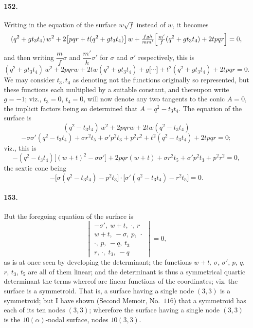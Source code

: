 \documentclass[11pt,a4paper]{article}
\begin{document}
\paragraph{152.}
Writing in the equation of the surface $w\sqrt{f}$ instead of $w$, it
becomes
\[
(q^2 + g t_3 t_4)\, w^2 + 2\bigl[p q r + t (q^2 + g t_3 t_4)\bigr]\, w
+ \tfrac{f g h}{m m'}\Bigl[\tfrac{m'}{f}(q^2 + g t_3 t_4)
+ 2 t p q r\Bigr] = 0,
\]
and then writing $\dfrac{m}{f}\sigma$ and $\dfrac{m'}{h}\sigma'$ for
$\sigma$ and $\sigma'$ respectively, this is
\[
(q^2 + g t_3 t_4)\, w^2 + 2 p q r w + 2 t w (q^2 + g t_3 t_4)
+ g\bigl[\dotsb\bigr] + t^2 (q^2 + g t_3 t_4) + 2 t p q r = 0.
\]
We may consider $t_3, t_4$ as denoting not the functions originally so
represented, but these functions each multiplied by a suitable constant,
and thereupon write $g = -1$; viz., $t_3 = 0$, $t_4 = 0$, will now denote
any two tangents to the conic $A = 0$, the implicit factors being so
determined that $A = q^2 - t_3 t_4$. The equation of the surface is
\[
(q^2 - t_3 t_4)\, w^2 + 2 p q r w + 2 t w (q^2 - t_3 t_4)
\]
\[
- \sigma \sigma'(q^2 - t_3 t_4) + \sigma r^2 t_5 + \sigma' p^2 t_3
+ p^2 r^2 + t^2 (q^2 - t_3 t_4) + 2 t p q r = 0;
\]
viz., this is
\[
- (q^2 - t_3 t_4)\bigl[(w + t)^2 - \sigma \sigma'\bigr]
+ 2 p q r (w + t) + \sigma r^2 t_5 + \sigma' p^2 t_3 + p^2 r^2 = 0,
\]
the sextic cone being
\[
- \bigl[\sigma(q^2 - t_3 t_4) - p^2 t_3\bigr]
\cdot \bigl[\sigma'(q^2 - t_3 t_4) - r^2 t_5\bigr] = 0.
\]

\paragraph{153.}
But the foregoing equation of the surface is
\[
\begin{vmatrix}
- \sigma',\ w + t,\ \cdot,\ r \\
w + t,\ -\sigma,\ p,\ \cdot \\
\cdot,\ p,\ -q,\ t_3 \\
r,\ \cdot,\ t_3,\ -q
\end{vmatrix}
= 0,
\]
as is at once seen by developing the determinant; the functions $w + t$,
$\sigma$, $\sigma'$, $p$, $q$, $r$, $t_3$, $t_5$ are all of them linear;
and the determinant is thus a symmetrical quartic determinant the terms
whereof are linear functions of the coordinates; viz. the surface is a
symmetroid. That is, a surface having a single node $(3, 3)$ is a
symmetroid; but I have shown (Second Memoir, No.~$116$) that a symmetroid
has each of its ten nodes $(3, 3)$; wherefore the surface having a
single node $(3, 3)$ is the $10(\alpha)$-nodal surface, nodes $10(3, 3)$.
\end{document}

